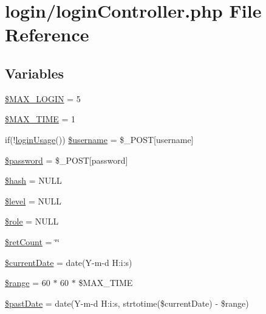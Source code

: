 \hypertarget{login_controller_8php}{}\section{login/login\+Controller.php File Reference}
\label{login_controller_8php}
\subsection*{Variables}
\begin{DoxyCompactItemize}
\item 
\hyperlink{login_controller_8php_a29df9d9e6f96a4deadc10ccad7ca7b85}{\$\+M\+A\+X\+\_\+\+L\+O\+G\+IN} = 5
\item 
\hyperlink{login_controller_8php_af965f1dde416adc9f91471416e63e3fc}{\$\+M\+A\+X\+\_\+\+T\+I\+ME} = 1
\item 
if(!\hyperlink{login_library_8php_acedd634aa4d2f9fe584e508b07d01ab5}{login\+Usage}()) \hyperlink{login_controller_8php_a0eb82aa5f81cf845de4b36cd653c42cf}{\$username} = \$\+\_\+\+P\+O\+ST\mbox{[}\textquotesingle{}username\textquotesingle{}\mbox{]}
\item 
\hyperlink{login_controller_8php_a607686ef9f99ea7c42f4f3dd3dbb2b0d}{\$password} = \$\+\_\+\+P\+O\+ST\mbox{[}\textquotesingle{}password\textquotesingle{}\mbox{]}
\item 
\hyperlink{login_controller_8php_ac9fdf6f2c8fb45c1d3bb9a176802b2ad}{\$hash} = N\+U\+LL
\item 
\hyperlink{login_controller_8php_abd32cc82c6a3f79491987de36ad580ca}{\$level} = N\+U\+LL
\item 
\hyperlink{login_controller_8php_a1ea903cca285c7c0b4c9203932100309}{\$role} = N\+U\+LL
\item 
\hyperlink{login_controller_8php_abf6d841a145ada2e5b68168ac15e9d1b}{\$ret\+Count} = \char`\"{}\char`\"{}
\item 
\hyperlink{login_controller_8php_a71b0d4434a284e136badb5b9a37f38bb}{\$current\+Date} = date(\textquotesingle{}Y-\/m-\/d H\+:i\+:s\textquotesingle{})
\item 
\hyperlink{login_controller_8php_ac2e4b5fa63099d7c943a803ae122dd2b}{\$range} = 60 $\ast$ 60 $\ast$ \$M\+A\+X\+\_\+\+T\+I\+ME
\item 
\hyperlink{login_controller_8php_a14cff6ab1fd58b8e2d49e54bbcd093d0}{\$past\+Date} = date(\textquotesingle{}Y-\/m-\/d H\+:i\+:s\textquotesingle{}, strtotime(\$current\+Date) -\/ \$range)
\item 

\end{DoxyCompactItemize}
